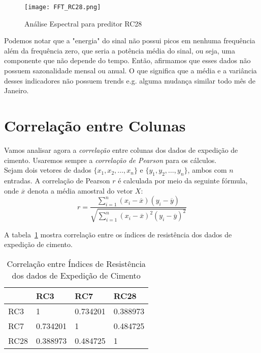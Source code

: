 \begin{figure}[H]
\centering
\texttt{[image: FFT\_RC28.png]}
\caption{Análise Espectral para preditor RC28}
\end{figure}


Podemos notar que a "energia" do sinal não possui picos em nenhuma frequência além da frequência zero, que seria a potência média do sinal, ou seja, uma componente que não depende do tempo. Então, afirmamos que esses dados não possuem sazonalidade mensal ou anual. O que significa que a média e a variância desses indicadores não possuem trends e.g. alguma mudança similar todo mês de Janeiro.


\section{Correlação entre Colunas}

Vamos analisar agora a \textit{correlação} entre colunas dos dados de expedição
de cimento. Usaremos sempre a \textit{correlação de Pearson} para os cálculos.
\\
Sejam dois vetores de
dados $\{x_1,x_2, \dots , x_n\}$ e $\{y_1,y_2, \dots , y_n\}$, ambos com $n$ entradas. A correlação de Pearson $r$ é calculada
por meio da seguinte fórmula, onde $\overline{x}$ denota a média amostral do
vetor $X$: \\



\[ r = \frac{{}\sum_{i=1}^{n} (x_i - \overline{x})(y_i - \overline{y})}
{\sqrt{\sum_{i=1}^{n} (x_i - \overline{x})^2(y_i - \overline{y})^2}} \] 


\bigskip


A tabela~\ref{tb:corr3728} mostra correlação entre os índices de resistência dos dados de
expedição de cimento. \\

\begin{table}[H]
\label{tb:corr3728}
\centering
\begin{tabular}{l|lll}
\cline{2-4}
\textbf{}                  & \multicolumn{1}{l|}{RC3} & \multicolumn{1}{l|}{RC7} & \multicolumn{1}{l|}{RC28} \\ \hline
\multicolumn{1}{|l|}{RC3}  & 1                        & 0.734201                 & 0.388973                  \\ \cline{1-1}
\multicolumn{1}{|l|}{RC7}  & 0.734201                 & 1                        & 0.484725                  \\ \cline{1-1}
\multicolumn{1}{|l|}{RC28} & 0.388973                 & 0.484725                 & 1                         \\ \cline{1-1}
\end{tabular}
\caption{Correlação entre Índices de Resistência dos dados de
  Expedição de Cimento}
\end{table}






